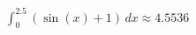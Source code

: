 \documentclass[preview]{standalone}
\begin{document}
\begin{align*}
\int_{0}^{2.5} \left(\sin(x) + 1\right) \, dx \approx 4.5536
\end{align*}
\end{document}
